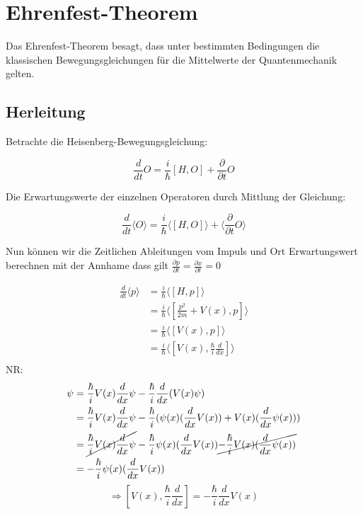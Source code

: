 



\section{Ehrenfest-Theorem}

Das Ehrenfest-Theorem besagt, dass unter bestimmten Bedingungen die klassischen Bewegungsgleichungen für die Mittelwerte der Quantenmechanik gelten.

\subsection{Herleitung}

Betrachte die Heisenberg-Bewegungsgleichung:

\[ \frac{d}{dt} O = \frac{i}{\hbar} [H,O] +\frac{\partial}{\partial t} O \]

Die Erwartungswerte der einzelnen Operatoren durch Mittlung der Gleichung:

\[ \boxed{\frac{d}{dt} \langle O\rangle  = \frac{i}{\hbar} \langle [H,O]\rangle  + \langle  \frac{\partial}{\partial t}  O\rangle } \]

Nun können wir die Zeitlichen Ableitungen vom Impuls und Ort Erwartungswert berechnen mit der Annhame dass gilt \(\frac{\partial p}{\partial t} = \frac{\partial x}{\partial t} =  0 \)


\begin{align}
 \frac{d}{dt} \langle p \rangle  &= \frac{i}{\hbar} \langle [H,p]\rangle \\
&= \frac{i}{\hbar} \langle [\frac{p^2}{2m}+V(x),p]\rangle   \\
&= \frac{i}{\hbar} \langle [V(x),p]\rangle   \\
&= \frac{i}{\hbar} \langle [V(x),\frac{\hbar}{i}\frac{d}{dx} ]\rangle   \\
\end{align}
NR:
 \begin{align}
[V(x),\frac{\hbar}{i}\frac{d}{dx} ]\psi &=\frac{\hbar}{i} V(x)\frac{d}{dx} \psi - \frac{\hbar}{i}\frac{d}{dx}  (V(x)\psi)\\
&= \frac{\hbar}{i} V(x)\frac{d}{dx} \psi -\frac{\hbar}{i}(\psi(x) (\frac{d}{dx}  V(x)) + V(x) (\frac{d}{dx} \psi(x))  )  \\
&= \cancel{\frac{\hbar}{i} V(x)\frac{d}{dx} \psi} -\frac{\hbar}{i}\psi(x) (\frac{d}{dx}  V(x))\cancel{ -\frac{\hbar}{i} V(x) (\frac{d}{dx} \psi(x))}   \\
&=-\frac{\hbar}{i}\psi(x) (\frac{d}{dx}  V(x))
\end{align}
\[\Rightarrow [V(x),\frac{\hbar}{i}\frac{d}{dx} ] = -\frac{\hbar}{i} \frac{d}{dx}  V(x) \]


